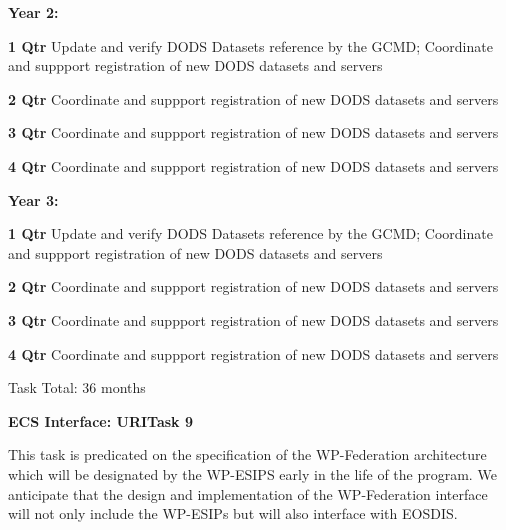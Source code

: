 \documentclass[12pt]{article}
\begin{document}
\begin{description}
\begin{description}
   \end{description}
 \item{\large \bf Year 2:}
   \begin{description}

   \item{\bf 1 Qtr} Update and verify DODS Datasets reference by the GCMD;
     Coordinate and suppport registration of new DODS datasets and servers 

   \item{\bf 2 Qtr} Coordinate and suppport registration of new DODS datasets
     and servers

   \item{\bf 3 Qtr} Coordinate and suppport registration of new DODS datasets
     and servers
         
   \item{\bf 4 Qtr} Coordinate and suppport registration of new DODS datasets
     and servers
         

   \end{description}
 \item{\large \bf Year 3:}
   \begin{description}
   \item{\bf 1 Qtr} Update and verify DODS Datasets reference by the GCMD;
     Coordinate and suppport registration of new DODS datasets and servers

   \item{\bf 2 Qtr} Coordinate and suppport registration of new DODS datasets
     and servers
         
   \item{\bf 3 Qtr} Coordinate and suppport registration of new DODS datasets
     and servers

   \item{\bf 4 Qtr} Coordinate and suppport registration of new DODS datasets
     and servers
         

 Task Total: 36 months

   \end{description}
\begin{center}
{\large \bf ECS Interface: URITask 9}
\end{center}
This task is predicated on the specification of the
WP-Federation architecture which will be designated by the WP-ESIPS early in
the life of the program.  We anticipate that the design and implementation of
the WP-Federation interface will not only include the WP-ESIPs but will also
interface with EOSDIS.  


\end{description}
\end{document}
